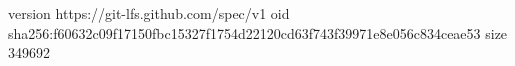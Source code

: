 version https://git-lfs.github.com/spec/v1
oid sha256:f60632c09f17150fbc15327f1754d22120cd63f743f39971e8e056c834ceae53
size 349692

